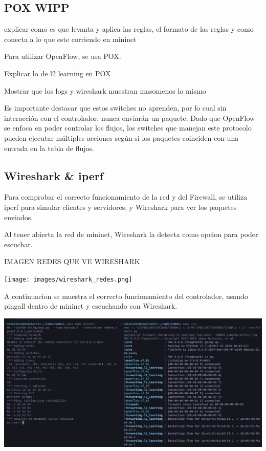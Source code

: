 \documentclass{article}
\begin{document}
\subsection{POX WIPP}\label{pox}
explicar como es que levanta y aplica las reglas, el formato de las reglas
y como conecta a lo que este corriendo en mininet


Para utilizar OpenFlow, se usa POX.

Explicar lo de l2 learning en POX

Mostrar que los logs y wireshark muestran masomenos lo mismo


Es importante destacar que estos switches no aprenden,
por lo cual sin interacción con el controlador, nunca enviarán un paquete.
Dado que OpenFlow se enfoca en poder controlar los flujos, los switches que manejan este protocolo pueden ejecutar
múltiples acciones según si los paquetes coinciden con una entrada en la tabla de flujos. 

\subsection{Wireshark \& iperf}\label{stop-and-wait}

Para comprobar el correcto funcionamiento de la red y del Firewall, se utiliza iperf para
simular clientes y servidores, y Wireshark para ver los paquetes enviados.

Al tener abierta la red de mininet, Wireshark la detecta como opcion para poder escuchar.

IMAGEN REDES QUE VE WIRESHARK
\begin{center}
\texttt{[image: images/wireshark\_redes.png]}
\end{center}

A continuacion se muestra el correcto funcionamiento del controlador, usando pingall dentro de mininet y escuchando con Wireshark.

\begin{center}
\includegraphics[scale=0.25]{images/mininet_pingall.png}
\end{center}
\end{document}
